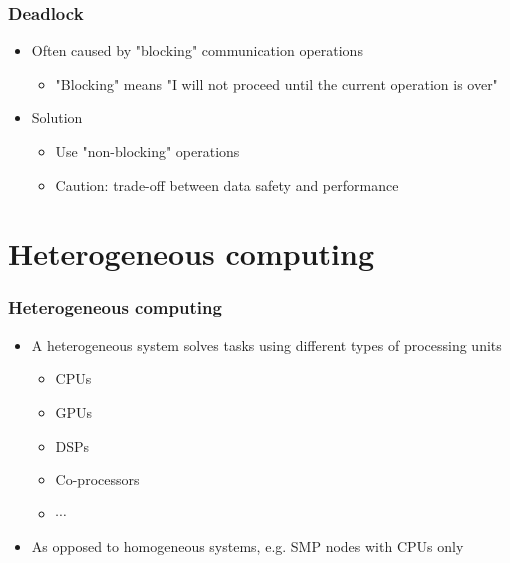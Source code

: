 \documentclass[10pt,t]{beamer}
\begin{document}
\begin{frame}
  \frametitle{Deadlock}
  \begin{itemize}
  \item Often caused by "blocking" communication operations
    \begin{itemize}
    \item "Blocking" means "I will not proceed until the current operation is over"
    \end{itemize}
  \item Solution
    \begin{itemize}
    \item Use "non-blocking" operations
    \item Caution: trade-off between data safety and performance
    \end{itemize}
  \end{itemize}
\end{frame}


\section{Heterogeneous computing}
\begin{frame}
  \frametitle{Heterogeneous computing}
  \begin{itemize}
  \item A heterogeneous system solves tasks using different types of processing units
    \begin{itemize}
    \item CPUs
    \item GPUs
    \item DSPs
    \item Co-processors
    \item $\cdots$
    \end{itemize}
  \item As opposed to homogeneous systems, e.g. SMP nodes with CPUs only
  \end{itemize}
\end{frame}
\end{document}
